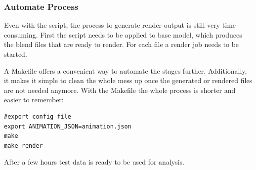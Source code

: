 \subsubsection{Automate Process}
Even with the script, the process to generate render output is still very time consuming. First the script needs to be applied to base model, which produces the blend files that are ready to render. For each file a render job needs to be started. 

A Makefile offers a convenient way to automate the stages further. Additionally, it makes it simple to clean the whole mess up once the generated or rendered files are not needed anymore. 
With the Makefile the whole process is shorter and easier to remember:
\textbf{}
\begin{lstlisting}
#export config file
export ANIMATION_JSON=animation.json
make
make render
\end{lstlisting}

After a few hours test data is ready to be used for analysis.



